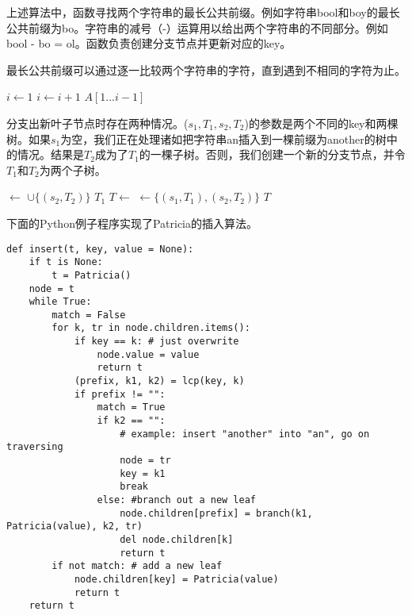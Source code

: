 \documentclass[UTF8]{article}
\begin{document}
上述算法中，函数寻找两个字符串的最长公共前缀。例如字符串bool和boy的最长公共前缀为bo。字符串的减号（-）运算用以给出两个字符串的不同部分。例如bool - bo = ol。函数负责创建分支节点并更新对应的key。

最长公共前缀可以通过逐一比较两个字符串的字符，直到遇到不相同的字符为止。

\begin{algorithmic}[1]
  \State $i \gets 1 $
    \State $i \gets i + 1$
  \EndWhile
  \State \Return $A[1...i-1]$
\EndFunction
\end{algorithmic}

分支出新叶子节点时存在两种情况。($s_1, T_1, s_2, T_2$)的参数是两个不同的key和两棵树。如果$s_1$为空，我们正在处理诸如把字符串an插入到一棵前缀为another的树中的情况。结果是$T_2$成为了$T_1$的一棵子树。否则，我们创建一个新的分支节点，并令$T_1$和$T_2$为两个子树。

\begin{algorithmic}[1]
    \State {} $\gets$  $\cup \{(s_2, T_2)\}$
    \State \Return $T_1$
  \EndIf
  \State $T \gets$ 
  \State {} $\gets \{(s_1, T_1), (s_2, T_2)\}$
  \State \Return $T$
\EndFunction
\end{algorithmic}

下面的Python例子程序实现了Patricia的插入算法。

\lstset{language=Python}
\begin{lstlisting}
def insert(t, key, value = None):
    if t is None:
        t = Patricia()
    node = t
    while True:
        match = False
        for k, tr in node.children.items():
            if key == k: # just overwrite
                node.value = value
                return t
            (prefix, k1, k2) = lcp(key, k)
            if prefix != "":
                match = True
                if k2 == "":
                    # example: insert "another" into "an", go on traversing
                    node = tr
                    key = k1
                    break
                else: #branch out a new leaf
                    node.children[prefix] = branch(k1, Patricia(value), k2, tr)
                    del node.children[k]
                    return t
        if not match: # add a new leaf
            node.children[key] = Patricia(value)
            return t
    return t
\end{lstlisting}
\end{document}

